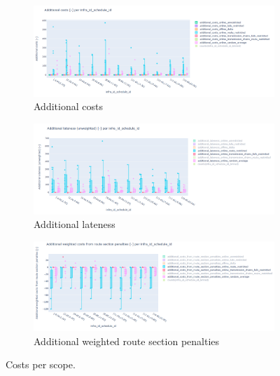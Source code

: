 \documentclass{article}
\begin{document}
\begin{figure}[hbtp]
        \begin{subfigure}{\textwidth}
            \includegraphics[width=\textwidth]{Figures/04_computational_results/additional_costs.PNG}
            \caption{Additional costs}
             \label{fig:additional_costs}
        \end{subfigure}
        \begin{subfigure}{\textwidth}
            \includegraphics[width=\textwidth]{Figures/04_computational_results/additional_lateness.PNG}
            \caption{Additional lateness}
             \label{fig:additional_lateness}
        \end{subfigure}
        \begin{subfigure}{\textwidth}
            \includegraphics[width=\textwidth]{Figures/04_computational_results/additional_route_section_penalties.PNG}
            \caption{Additional weighted route section penalties}
             \label{fig:additional_route_section_penalties}
        \end{subfigure}
	\caption{Costs per scope.}
	\label{fig:delay}
\end{figure}
\end{document}
